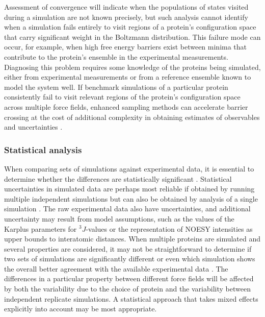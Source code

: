 \documentclass[9pt,review,pubversion]{livecoms}
\begin{document}
Assessment of convergence will indicate when the populations of states visited during a simulation are not known precisely, but such analysis cannot identify when a simulation fails entirely to visit regions of a protein's configuration space that carry significant weight in the Boltzmann distribution.
This failure mode can occur, for example, when high free energy barriers exist between minima that contribute to the protein's ensemble in the experimental measurements.
Diagnosing this problem requires some knowledge of the proteins being simulated, either from experimental measurements or from a reference ensemble known to model the system well.
If benchmark simulations of a particular protein consistently fail to visit relevant regions of the protein's configuration space across multiple force fields, enhanced sampling methods \cite{henin_enhanced_2022} can accelerate barrier crossing at the cost of additional complexity in obtaining estimates of observables and uncertainties \cite{grossfield_best_2019}.

\subsubsection{Statistical analysis}
\label{sub2:statistics}

When comparing sets of simulations against experimental data, it is essential to determine whether the differences are statistically significant \cite{van_gunsteren_validation_2018}.
Statistical uncertainties in simulated data are perhaps most reliable if obtained by running multiple independent simulations but can also be obtained by analysis of a single simulation \cite{grossfield_best_2019}.
The raw experimental data also have uncertainties, and additional uncertainty may result from model assumptions, such as the values of the Karplus parameters for $^3J$-values or the representation of NOESY intensities as upper bounds to interatomic distances.
When multiple proteins are simulated and several properties are considered, it may not be straightforward to determine if two sets of simulations are significantly different or even which simulation shows the overall better agreement with the available experimental data \cite{wassenaar_effect_2006,villa_how_2007,stroet_validation_2024}.
The differences in a particular property between different force fields will be affected by both the variability due to the choice of protein and the variability between independent replicate simulations.
A statistical approach that takes mixed effects explicitly into account \cite{stroet_validation_2024} may be most appropriate.
\end{document}
